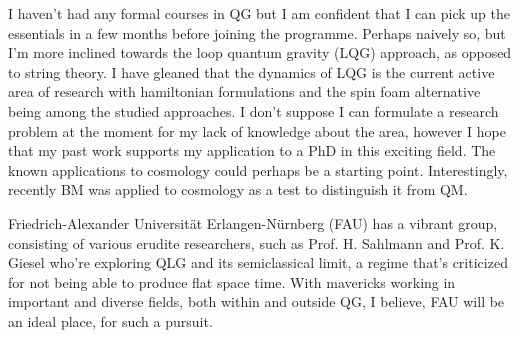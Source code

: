 I haven't had any formal courses in QG but I am confident that I can pick up the essentials in a few months before joining the programme. Perhaps naively so, but I'm more inclined towards the loop quantum gravity (LQG) approach, as opposed to string theory. I have gleaned that the dynamics of LQG is the current active area of research with hamiltonian formulations and the spin foam alternative being among the studied approaches. I don't suppose I can formulate a research problem at the moment for my lack of knowledge about the area, however I hope that my past work supports my application to a PhD in this exciting field. The known applications to cosmology could perhaps be a starting point. Interestingly, recently BM was applied to cosmology as a test to distinguish it from QM.

Friedrich-Alexander Universit\"at Erlangen-N\"urnberg (FAU) has a vibrant group, consisting of various erudite researchers, such as Prof. H. Sahlmann and Prof. K. Giesel who're exploring QLG and its semiclassical limit, a regime that's criticized for not being able to produce flat space time. With mavericks working in important and diverse fields, both within and outside QG, I believe, FAU will be an ideal place, for such a pursuit.






